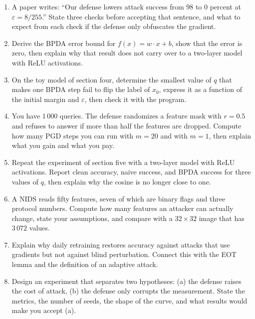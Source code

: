 \begin{latihan}
\begin{enumerate}
  \item A paper writes: ``Our defense lowers attack success from
        $98$ to $0$ percent at $\varepsilon=8/255$.'' State three checks
        before accepting that sentence, and what to expect from each check if
        the defense only obfuscates the gradient.
  \item Derive the BPDA error bound for $f(x)=w\cdot x+b$, show that the error is zero, then
        explain why that result does not carry over to a two-layer model with ReLU activations.
  \item On the toy model of section four, determine the smallest value of $q$ that makes one
        BPDA step fail to flip the label of $x_0$, express it as a function of the initial margin and
        $\varepsilon$, then check it with the program.
  \item You have $1\,000$ queries. The defense randomizes a feature mask with $r=0.5$ and
        refuses to answer if more than half the features are dropped. Compute how many PGD steps
        you can run with $m=20$ and with $m=1$, then explain what you gain and what you pay.
  \item Repeat the experiment of section five with a two-layer model with ReLU activations. Report
        clean accuracy, naive success, and BPDA success for three values of $q$,
        then explain why the cosine is no longer close to one.
  \item A NIDS reads fifty features, seven of which are binary flags and three
        protocol numbers. Compute how many features an attacker can actually change, state
        your assumptions, and compare with a $32\times32$ image that has $3\,072$ values.
  \item Explain why daily retraining restores accuracy against attacks that use
        gradients but not against blind perturbation. Connect this with the EOT lemma and
        the definition of an adaptive attack.
  \item Design an experiment that separates two hypotheses: (a) the defense raises the cost of
        attack, (b) the defense only corrupts the measurement. State the metrics, the number of seeds,
        the shape of the curve, and what results would make you accept (a).
\end{enumerate}
\end{latihan}

